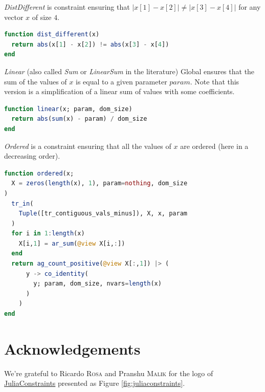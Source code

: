 \documentclass{juliacon}
\newcommand{\jc}{\href{https://github.com/JuliaConstraints}{JuliaConstraints}\xspace}
\begin{document}
\emph{DistDifferent} is constraint ensuring that \(|x[1] - x[2]| \neq |x[3] - x[4]|\) for any vector $x$ of size $4$.

\begin{lstlisting}[language = Julia]
function dist_different(x)
  return abs(x[1] - x[2]) != abs(x[3] - x[4])
end
\end{lstlisting}

\emph{Linear} (also called \emph{Sum} or \emph{LinearSum} in the literature) Global ensures that the sum of the values of $x$ is equal to a given parameter $param$. Note that this version is a simplification of a linear sum of values with some coefficients.

\begin{lstlisting}[language = Julia]
function linear(x; param, dom_size)
  return abs(sum(x) - param) / dom_size
end
\end{lstlisting}

\emph{Ordered} is a constraint ensuring that all the values of $x$ are ordered (here in a decreasing order).

\begin{lstlisting}[language = Julia]
function ordered(x;
  X = zeros(length(x), 1), param=nothing, dom_size
)
  tr_in(
    Tuple([tr_contiguous_vals_minus]), X, x, param
  )
  for i in 1:length(x)
    X[i,1] = ar_sum(@view X[i,:])
  end
  return ag_count_positive(@view X[:,1]) |> (
      y -> co_identity(
        y; param, dom_size, nvars=length(x)
      )
    )
end
\end{lstlisting}

\section{Acknowledgements}
\label{sec:acknowledgements}

We're grateful to Ricardo \textsc{Rosa} and Pranshu \textsc{Malik} for the logo of \jc presented as Figure \ref{fig:juliaconstraints}.


\end{document}
